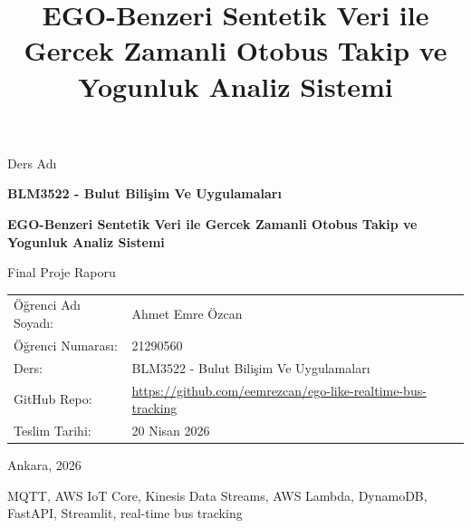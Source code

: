 \documentclass[conference,a4paper]{IEEEtran}
\title{EGO-Benzeri Sentetik Veri ile Gercek Zamanli Otobus Takip ve Yogunluk Analiz Sistemi}
\author{
\IEEEauthorblockN{Ahmet Emre Özcan}
\IEEEauthorblockA{
BLM3522 - Bulut Bilişim Ve Uygulamaları \\
21290560
}
}
\begin{document}
\begin{titlepage}
    \centering
    {\Large Ders Adı \par}
    \vspace{0.4cm}
    {\Large\bfseries BLM3522 - Bulut Bilişim Ve Uygulamaları \par}
    \vspace{1.5cm}
    {\Huge\bfseries EGO-Benzeri Sentetik Veri ile Gercek Zamanli Otobus Takip ve Yogunluk Analiz Sistemi \par}
    \vspace{1.2cm}
    {\large Final Proje Raporu \par}
    \vfill

    \begin{tabular}{lp{}}
        Öğrenci Adı Soyadı: & Ahmet Emre Özcan \\
        Öğrenci Numarası: & 21290560 \\
        Ders: & BLM3522 - Bulut Bilişim Ve Uygulamaları \\
        GitHub Repo: & \url{https://github.com/eemrezcan/ego-like-realtime-bus-tracking} \\
        Teslim Tarihi: & 20 Nisan 2026 \\
    \end{tabular}

    \vfill
    {\large Ankara, 2026 \par}
\end{titlepage}

\setcounter{page}{1}
\onecolumn
\tableofcontents
\newpage

\twocolumn
{}
\setcounter{page}{1}

\maketitle

\begin{abstract}

\end{abstract}

\begin{IEEEkeywords}
MQTT, AWS IoT Core, Kinesis Data Streams, AWS Lambda, DynamoDB, FastAPI, Streamlit, real-time bus tracking
\end{IEEEkeywords}












\end{document}
